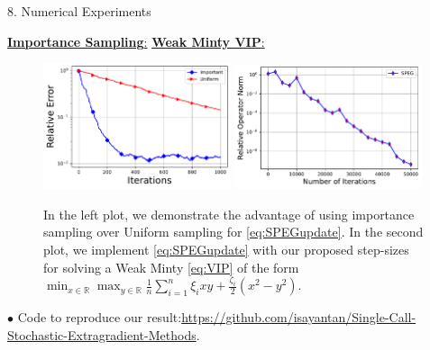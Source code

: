 \documentclass[24pt,final]{beamer}
\newlength{\onecolwid}
\newlength{\twocolwid}
\begin{document}
\begin{frame}[t]
\begin{columns}[t]
\begin{column}{\twocolwid}
\begin{columns}[t,totalwidth=\twocolwid]
\begin{column}{\onecolwid}
\begin{block}{8. Numerical Experiments}
\begin{figure}
        \end{figure}
        \underline{\textbf{Importance Sampling}:}  \qquad  \qquad          \underline{\textbf{Weak Minty VIP}:}      
        \begin{figure}
            \centering
            \includegraphics[width=0.49\textwidth]{Figures/Uniform vs Important Sampling with Lmax = 20 .pdf}
            \includegraphics[width=0.49\textwidth]{Figures/SPEG_on_WMVI_w_rel_op_err_batchsize = 0.15.pdf}
            \caption{In the left plot, we demonstrate the advantage of using importance sampling over Uniform sampling for \ref{eq:SPEGupdate}. In the second plot, we implement \ref{eq:SPEGupdate} with our proposed step-sizes for solving a Weak Minty \ref{eq:VIP} of the form $\min_{x \in \mathbb{R}} \max_{y \in \mathbb{R}} \frac{1}{n} \sum_{i = 1}^n \xi_{i} xy + \frac{\zeta_i}{2}(x^2 - y^2)$.}
        \end{figure}
        $\bullet$ Code to reproduce our result:\href{https://github.com/isayantan/Single-Call-Stochastic-Extragradient-Methods}{https://github.com/isayantan/Single-Call-Stochastic-Extragradient-Methods}.
        \end{block}		
		\end{column} %
  
  \end{columns}


\end{column}
\end{columns}
\end{frame}
\end{document}
